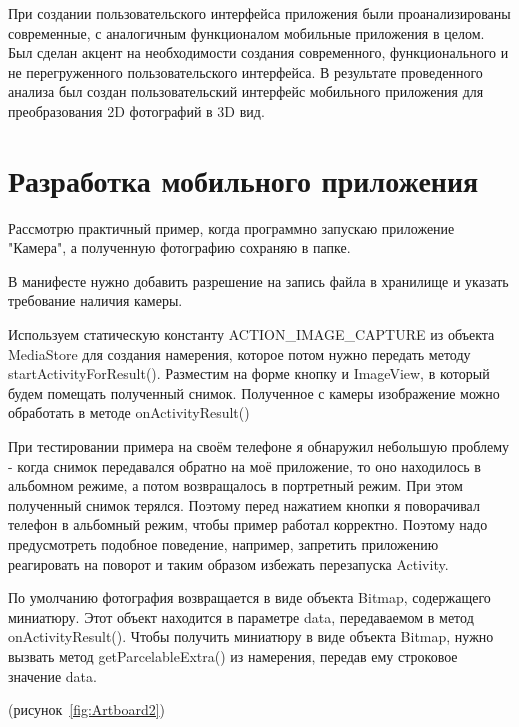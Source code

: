При создании пользовательского интерфейса приложения были проанализированы современные, с аналогичным функционалом мобильные приложения в целом. Был сделан акцент на необходимости создания современного, функционального и не перегруженного пользовательского интерфейса. В результате проведенного анализа был создан пользовательский интерфейс мобильного приложения для преобразования 2D фотографий в 3D вид.

\section{Разработка мобильного приложения}

Рассмотрю практичный пример, когда программно запускаю приложение "Камера", а полученную фотографию сохраняю в папке.

В манифесте нужно добавить разрешение на запись файла в хранилище и указать требование наличия камеры.

Используем статическую константу ACTION\_IMAGE\_CAPTURE из объекта MediaStore для создания намерения, которое потом нужно передать методу startActivityForResult(). Разместим на форме кнопку и ImageView, в который будем помещать полученный снимок. Полученное с камеры изображение можно обработать в методе onActivityResult()

При тестировании примера на своём телефоне я обнаружил небольшую проблему - когда снимок передавался обратно на моё приложение, то оно находилось в альбомном режиме, а потом возвращалось в портретный режим. При этом полученный снимок терялся. Поэтому перед нажатием кнопки я поворачивал телефон в альбомный режим, чтобы пример работал корректно. Поэтому надо предусмотреть подобное поведение, например, запретить приложению реагировать на поворот и таким образом избежать перезапуска Activity. 

По умолчанию фотография возвращается в виде объекта Bitmap, содержащего миниатюру. Этот объект находится в параметре data, передаваемом в метод onActivityResult(). Чтобы получить миниатюру в виде объекта Bitmap, нужно вызвать метод getParcelableExtra() из намерения, передав ему строковое значение data.

(рисунок~\ref{fig:Artboard2})

